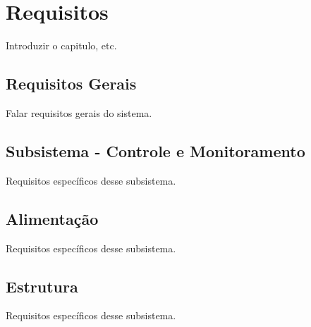 \chapter{Requisitos}

Introduzir o capitulo, etc.

\section{Requisitos Gerais}

Falar requisitos gerais do sistema.

\section{Subsistema - Controle e Monitoramento}

Requisitos específicos desse subsistema.

\section{Alimentação}

Requisitos específicos desse subsistema.

\section{Estrutura}

Requisitos específicos desse subsistema.
